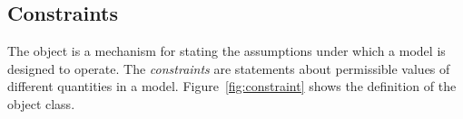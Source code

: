 %
%
%
%
%
%
%
%
%
%
%
%
%


\subsection{Constraints}
\label{sec:constraints}

The \Constraint object is a mechanism for stating the
assumptions under which a model is designed to operate.  The
\emph{constraints} are statements about permissible values of
different quantities in a model.  Figure~\ref{fig:constraint}
shows the definition of the \Constraint object class.

